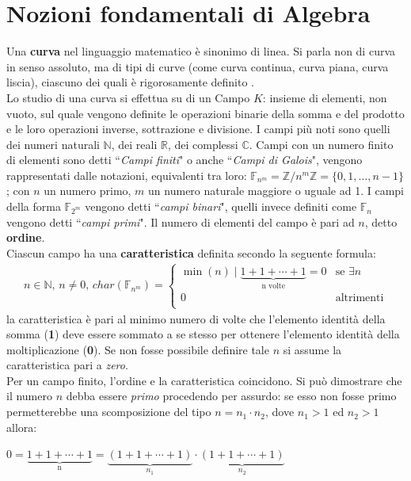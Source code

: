 \documentclass[a4paper,12pt]{tesiinfo}
\begin{document}
\chapter{Nozioni fondamentali di Algebra}
Una \textbf{curva} nel linguaggio matematico \`e sinonimo di linea. Si parla non di curva in senso assoluto, ma di tipi di curve (come curva continua, curva piana, curva liscia), ciascuno dei quali \`e rigorosamente definito \cite{curva3c}.
\\
Lo studio di una curva si effettua su di un Campo $K$: insieme di elementi, non vuoto, sul quale vengono definite le operazioni binarie della somma e del prodotto e le loro operazioni inverse, sottrazione e divisione. I campi pi\`u noti sono quelli dei numeri naturali $\mathbb{N}$, dei reali $\mathbb{R}$, dei complessi $\mathbb{C}$. Campi con un numero finito di elementi sono detti ``\textit{Campi finiti}" o anche ``\textit{Campi di Galois}", vengono rappresentati dalle notazioni, equivalenti tra loro:  $\mathbb{F}_{n^m} = \mathbb{Z}/{n^m}\mathbb{Z} = \{0, 1, \ldots, n-1\}$; con $n$ un numero primo, $m$ un numero naturale maggiore o uguale ad 1. I campi della forma $\mathbb{F}_{2^m}$ vengono detti ``\textit{campi binari}", quelli invece definiti come $\mathbb{F}_{n}$ vengono detti ``\textit{campi primi}". Il numero di elementi del campo \`e pari ad $n$, detto \textbf{ordine}.
\\
Ciascun campo ha una \textbf{caratteristica} definita secondo la seguente formula:
\begin{gather}
n \in \mathbb{N}\text{, }n \ne 0 \text{, }char(\mathbb{F}_{n^m}) = \begin{cases} \min (n) \mid \underbrace{1+1+\cdots+1}_\text{n volte} = 0 & \mbox{se }\exists n\\
0 & \mbox{altrimenti}\\
\end{cases}
\label{charField}
\end{gather}
la caratteristica \`e pari al minimo numero di volte che l'elemento identit\`a della somma (\textbf{1}) deve essere sommato a se stesso per ottenere l'elemento identit\`a della moltiplicazione (\textbf{0}). Se non fosse possibile definire tale $n$ si assume la caratteristica pari a \textit{zero}. 
\\
Per un campo finito, l'ordine e la caratteristica coincidono. Si pu\`o dimostrare che il numero $n$ debba essere \textit{primo} procedendo per assurdo: se esso non fosse primo permetterebbe una scomposizione del tipo $n=n_1 \cdot n_2$, dove $n_1>1$ ed $n_2>1$ allora:
\begin{center}
 $0=\underbrace{1+1+\cdots+1}_\text{n} = \underbrace{(1+1+\cdots+1)}_{n_1} \cdot \underbrace{(1+1+\cdots+1)}_{n_2}$
\end{center}
\end{document}
